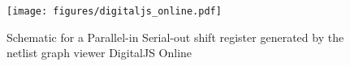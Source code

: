 
\begin{figure}[t]
    \centering
    \texttt{[image: figures/digitaljs\_online.pdf]}
    \caption{Schematic for a Parallel-in Serial-out shift register generated by the netlist graph viewer DigitalJS Online \cite{DigitalJSOnline}}
    \label{fig:digitaljs_online}
\end{figure}
